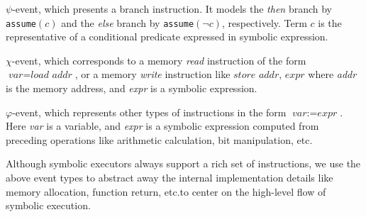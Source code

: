 \documentclass[sigconf]{acmart}
\newcommand{\textcode}[1]{\texttt{#1}}
\begin{document}
\begin{itemize*}
  \item $\psi$-event, which presents a branch instruction. It models the 
    \textit{then} branch by \textcode{assume$(c)$} and the \textit{else} 
    branch by \textcode{assume$(\neg c)$}, respectively. Term $\textit{c}$ 
    is the representative of a conditional predicate expressed in symbolic 
    expression. 

  \item $\chi$-event, which corresponds to a memory \textit{read} instruction 
    of the form $\textit{var}=\textit{load~addr}$, or a memory \textit{write} 
    instruction like $\textit{store~addr, expr}$ where \textit{addr} is the 
    memory address, and \textit{expr} is a symbolic expression.

  \item $\varphi$-event, which represents other types of instructions in the 
    form $\textit{var}:=\textit{expr}$. Here \textit{var} is a variable, and 
    \textit{expr} is a symbolic expression computed from preceding operations 
    like arithmetic calculation, bit manipulation, etc.
\end{itemize*}


Although symbolic executors always support a rich set of instructions, we use 
the above event types to abstract away the internal implementation details like 
memory allocation, function return, etc.to center on the high-level flow of 
symbolic execution.
\end{document}
